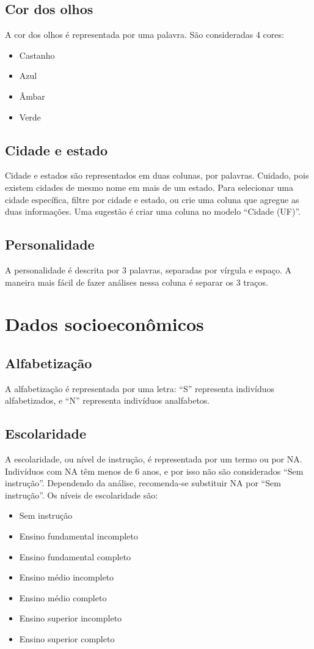 \documentclass{book}
\begin{document}
\subsection{Cor dos olhos}
A cor dos olhos é representada por uma palavra. São consideradas 4 cores:
\begin{itemize}
  \item Castanho
  \item Azul
  \item Âmbar
  \item Verde
\end{itemize}

\subsection{Cidade e estado}
Cidade e estados são representados em duas colunas, por palavras. Cuidado, pois existem cidades de mesmo nome em mais de um estado. Para selecionar uma cidade específica, filtre por cidade e estado, ou crie uma coluna que agregue as duas informações. Uma sugestão é criar uma coluna no modelo ``Cidade (UF)''.

\subsection{Personalidade}
A personalidade é descrita por 3 palavras, separadas por vírgula e espaço. A maneira mais fácil de fazer análises nessa coluna é separar os 3 traços.

\section{Dados socioeconômicos}

\subsection{Alfabetização}
A alfabetização é representada por uma letra: ``S'' representa indivíduos alfabetizados, e ``N'' representa indivíduos analfabetos.

\subsection{Escolaridade}
A escolaridade, ou nível de instrução, é representada por um termo ou por NA. Indivíduos com NA têm menos de 6 anos, e por isso não são considerados ``Sem instrução''. Dependendo da análise, recomenda-se substituir NA por ``Sem instrução''. Os níveis de escolaridade são:
\begin{itemize}
  \item Sem instrução
  \item Ensino fundamental incompleto
  \item Ensino fundamental completo
  \item Ensino médio incompleto
  \item Ensino médio completo
  \item Ensino superior incompleto
  \item Ensino superior completo
\end{itemize}
\end{document}
